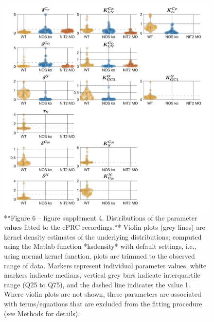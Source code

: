 \documentclass[
  10pt,
  onecolumn]{article}
\begin{document}
\begin{figure}
\includegraphics[width=26.25in]{figures/Figure6_fig_Suppl4} \caption{**Figure 6 -- figure supplement 4. Distributions of the parameter values fitted to the cPRC recordings.** Violin plots (grey lines) are kernel density estimates of the underlying distributions; computed using the Matlab function *ksdensity* with default settings, i.e., using normal kernel function, plots are trimmed to the observed range of data. Markers represent individual parameter values, white markers indicate medians, vertical grey bars indicate interquartile range (Q25 to Q75), and the dashed line indicates the value 1. Where violin plots are not shown, these parameters are associated with terms/equations that are excluded from the fitting procedure (see Methods for details).}\label{fig:unnamed-chunk-23}
\end{figure}
\end{document}
